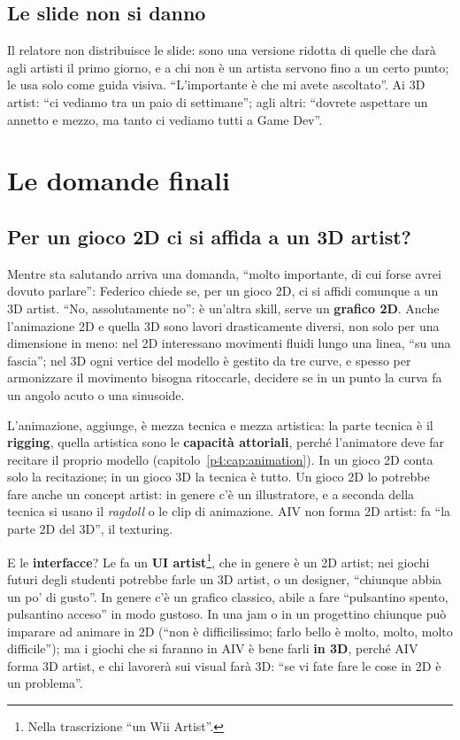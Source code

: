 \subsection{Le slide non si danno}

Il relatore non distribuisce le slide: sono una versione ridotta di quelle che
darà agli artisti il primo giorno, e a chi non è un artista servono fino a un
certo punto; le usa solo come guida visiva. ``L'importante è che mi avete
ascoltato''. Ai 3D artist: ``ci vediamo tra un paio di settimane''; agli altri:
``dovrete aspettare un annetto e mezzo, ma tanto ci vediamo tutti a Game Dev''.

\section{Le domande finali}
\label{p6:sec:domande}

\subsection{Per un gioco 2D ci si affida a un 3D artist?}

Mentre sta salutando arriva una domanda, ``molto importante, di cui forse avrei
dovuto parlare'': Federico chiede se, per un gioco 2D, ci si affidi comunque a
un 3D artist. ``No, assolutamente no'': è un'altra skill, serve un
\textbf{grafico 2D}. Anche l'animazione 2D e quella 3D sono lavori
drasticamente diversi, non solo per una dimensione in meno: nel 2D interessano
movimenti fluidi lungo una linea, ``su una fascia''; nel 3D ogni vertice del
modello è gestito da tre curve, e spesso per armonizzare il movimento bisogna
ritoccarle, decidere se in un punto la curva fa un angolo acuto o una
sinusoide.

L'animazione, aggiunge, è mezza tecnica e mezza artistica: la parte tecnica è il
\textbf{rigging}, quella artistica sono le \textbf{capacità attoriali}, perché
l'animatore deve far recitare il proprio modello (capitolo~\ref{p4:cap:animation}).
In un gioco 2D conta solo la recitazione; in un gioco 3D la tecnica è tutto. Un
gioco 2D lo potrebbe fare anche un concept artist: in genere c'è un
illustratore, e a seconda della tecnica si usano il \emph{ragdoll} o le clip di
animazione. AIV non forma 2D artist: fa ``la parte 2D del 3D'', il texturing.

E le \textbf{interfacce}? Le fa un \textbf{UI artist}\footnote{Nella
trascrizione ``un Wii Artist''.}, che in genere è un 2D artist; nei giochi
futuri degli studenti potrebbe farle un 3D artist, o un designer, ``chiunque
abbia un po' di gusto''. In genere c'è un grafico classico, abile a fare
``pulsantino spento, pulsantino acceso'' in modo gustoso. In una jam o in un
progettino chiunque può imparare ad animare in 2D (``non è difficilissimo;
farlo bello è molto, molto, molto difficile''); ma i giochi che si faranno in
AIV è bene farli \textbf{in 3D}, perché AIV forma 3D artist, e chi lavorerà sui
visual farà 3D: ``se vi fate fare le cose in 2D è un problema''.

